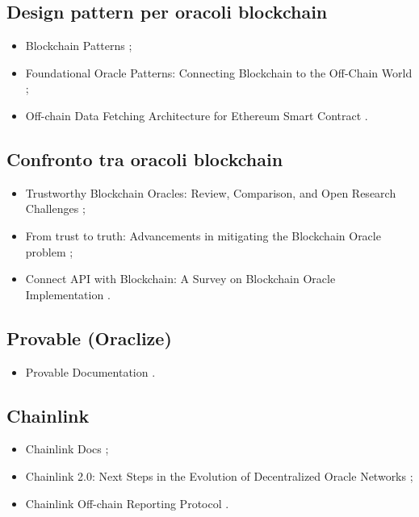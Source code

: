 \subsection*{Design pattern per oracoli blockchain}
\begin{itemize}

\item Blockchain Patterns \cite{xu2019blockchainpatterns};

\item Foundational Oracle Patterns: Connecting Blockchain to the Off-Chain World \cite{wohrer2020oraclepatterns};

\item Off-chain Data Fetching Architecture for Ethereum Smart Contract \cite{liu2020oraclepatterns}.

\end{itemize}

\subsection*{Confronto tra oracoli blockchain}
\begin{itemize}

\item Trustworthy Blockchain Oracles: Review, Comparison, and Open Research Challenges \cite{albreiki2020oraclescompared};

\item From trust to truth: Advancements in mitigating the Blockchain Oracle problem \cite{hassan2023oraclescompared};

\item Connect API with Blockchain: A Survey on Blockchain Oracle Implementation \cite{pasdar2023oraclescompared}.

\end{itemize}

\subsection*{Provable (Oraclize)}
\begin{itemize}

\item Provable Documentation \cite{provable2024doc}.

\end{itemize}

\subsection*{Chainlink}
\begin{itemize}

\item Chainlink Docs \cite{chainlink2024doc};

\item Chainlink 2.0: Next Steps in the Evolution of Decentralized Oracle Networks \cite{chainlink2021whitepaper};

\item Chainlink Off-chain Reporting Protocol \cite{chainlink2021protocol}.

\end{itemize}

